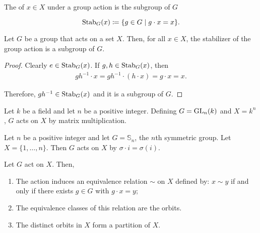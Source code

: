 \begin{definition}\label{def:group-theory:stabilizer}
  The  of \(x \in X\) under a group action is the subgroup of \(G\)

  \[\operatorname{Stab}_{G}(x) \coloneqq \{ g \in G \mid g \cdot x = x \}.\]
\end{definition}

\begin{lemma}\label{lem:group-theory:stabilizer-is-subgroup}
  Let \(G\) be a group that acts on a set \(X\). Then, for all \(x \in X\), the stabilizer of the group action is a subgroup of \(G\).
\end{lemma}

\begin{proof}
  Clearly \(e \in \operatorname{Stab}_{G}(x)\). If \(g, h \in \operatorname{Stab}_{G}(x)\), then
  \begin{align*}
    gh^{-1} \cdot x = gh^{-1} \cdot (h \cdot x) = g \cdot x = x.
  \end{align*}

  Therefore, \(gh^{-1} \in \operatorname{Stab}_{G}(x)\) and it is a subgroup of \(G\).
\end{proof}

\begin{example}
  Let \(k\) be a field and let \(n\) be a positive integer. Defining \(G = \operatorname{GL}_{n}(k)\) and \(X = k^{n}\), \(G\) acts on \(X\) by matrix multiplication.
\end{example}

\begin{example}
  Let \(n\) be a positive integer and let \(G = \mathbb S_{n}\), the \(n\)th symmetric group. Let \(X = \{1, \ldots, n\}\). Then \(G\) acts on \(X\) by \(\sigma \cdot i = \sigma(i)\).
\end{example}


\begin{lemma}\label{lem:group-theory:orbits-partition}
  Let \(G\) act on \(X\). Then,
  \begin{enumerate}
    \item The action induces an equivalence relation \(\sim\) on \(X\) defined by: \(x \sim y\) if and only if there exists \(g \in G\) with \(g \cdot x = y\);
    \item The equivalence classes of this relation are the orbits.
    \item The distinct orbits in \(X\) form a partition of \(X\).
  \end{enumerate}
\end{lemma}


